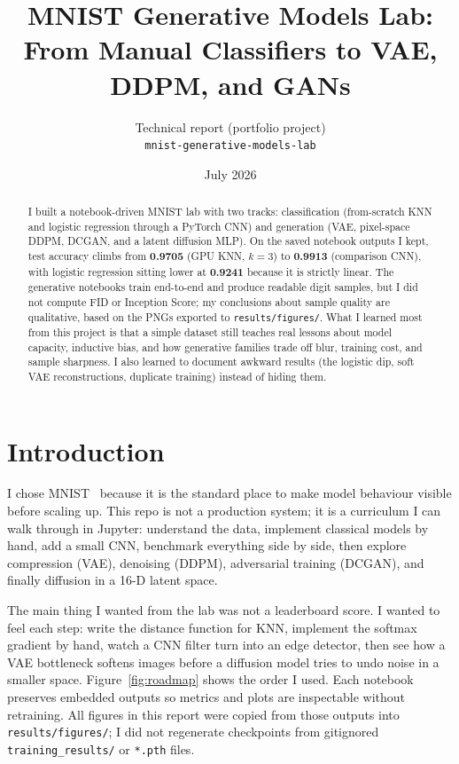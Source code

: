 \documentclass[11pt,a4paper]{article}
\title{\textbf{MNIST Generative Models Lab:\\From Manual Classifiers to VAE, DDPM, and GANs}}
\author{Technical report (portfolio project)\\
  \texttt{mnist-generative-models-lab}}
\date{July 2026}
\begin{document}
\maketitle

\begin{abstract}
I built a notebook-driven MNIST lab with two tracks: classification (from-scratch KNN and logistic regression through a PyTorch CNN) and generation (VAE, pixel-space DDPM, DCGAN, and a latent diffusion MLP). On the saved notebook outputs I kept, test accuracy climbs from \textbf{0.9705} (GPU KNN, $k{=}3$) to \textbf{0.9913} (comparison CNN), with logistic regression sitting lower at \textbf{0.9241} because it is strictly linear. The generative notebooks train end-to-end and produce readable digit samples, but I did not compute FID or Inception Score; my conclusions about sample quality are qualitative, based on the PNGs exported to \texttt{results/figures/}. What I learned most from this project is that a simple dataset still teaches real lessons about model capacity, inductive bias, and how generative families trade off blur, training cost, and sample sharpness. I also learned to document awkward results (the logistic dip, soft VAE reconstructions, duplicate training) instead of hiding them.
\end{abstract}

\section{Introduction}
\label{sec:intro}

I chose MNIST~\citep{lecun1998gradient} because it is the standard place to make model behaviour visible before scaling up. This repo is not a production system; it is a curriculum I can walk through in Jupyter: understand the data, implement classical models by hand, add a small CNN, benchmark everything side by side, then explore compression (VAE), denoising (DDPM), adversarial training (DCGAN), and finally diffusion in a 16-D latent space.

The main thing I wanted from the lab was not a leaderboard score. I wanted to feel each step: write the distance function for KNN, implement the softmax gradient by hand, watch a CNN filter turn into an edge detector, then see how a VAE bottleneck softens images before a diffusion model tries to undo noise in a smaller space. Figure~\ref{fig:roadmap} shows the order I used. Each notebook preserves embedded outputs so metrics and plots are inspectable without retraining. All figures in this report were copied from those outputs into \texttt{results/figures/}; I did not regenerate checkpoints from gitignored \texttt{training\_results/} or \texttt{*.pth} files.
\end{document}
